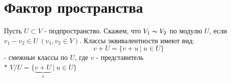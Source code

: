 \section{Фактор пространства}
    \begin{definition}
        Пусть $U \subset V$ - подпространство. Скажем, что $V_1 \thicksim V_2$ по модулю $U$, если $v_1 - v_2 \in U \ (v_1,v_2 \in V)$. Классы эквивалентности имеют вид: 
        $$v + U = \{v + u \ | \ u \in U\}$$
        - смежные классы по $U$, где $v$ - представитель\\
        $*$ $V/U = \{\underbrace{v + U}_{\overline{v}}  \ | \ u \in U\}$
    \end{definition}

